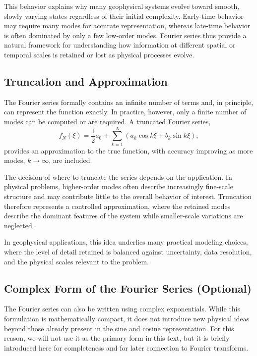 This behavior explains why many geophysical systems evolve toward smooth, slowly varying states regardless of their initial complexity. Early-time behavior may require many modes for accurate representation, whereas late-time behavior is often dominated by only a few low-order modes. Fourier series thus provide a natural framework for understanding how information at different spatial or temporal scales is retained or lost as physical processes evolve.

\subsection{Truncation and Approximation}

The Fourier series formally contains an infinite number of terms and, in principle, can represent the function exactly. In practice, however, only a finite number of modes can be computed or are required. A truncated Fourier series,
\begin{equation}
    f_N(\xi) = \frac{1}{2} a_0 + \sum_{k = 1}^{N}
    \left( a_k \cos k \xi + b_k \sin k \xi \right),
\end{equation}
provides an approximation to the true function, with accuracy improving as more modes, $k \to \infty$, are included.

The decision of where to truncate the series depends on the application. In physical problems, higher-order modes often describe increasingly fine-scale structure and may contribute little to the overall behavior of interest. Truncation therefore represents a controlled approximation, where the retained modes describe the dominant features of the system while smaller-scale variations are neglected.

In geophysical applications, this idea underlies many practical modeling choices, where the level of detail retained is balanced against uncertainty, data resolution, and the physical scales relevant to the problem.

\subsection{Complex Form of the Fourier Series (Optional)}

The Fourier series can also be written using complex exponentials. While this formulation is mathematically compact, it does not introduce new physical ideas beyond those already present in the sine and cosine representation. For this reason, we will not use it as the primary form in this text, but it is briefly introduced here for completeness and for later connection to Fourier transforms.

